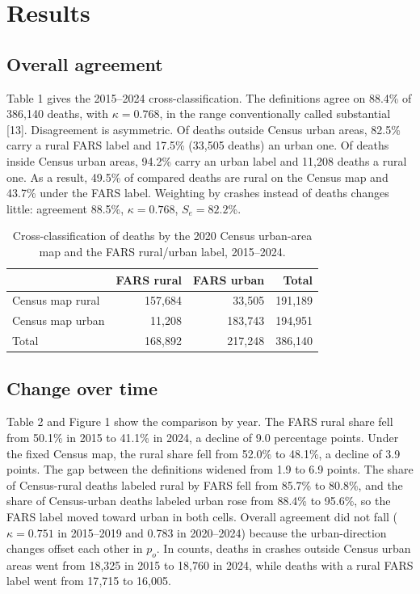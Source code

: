 \documentclass{article}
\begin{document}
\section{Results}

\subsection{Overall agreement}

Table 1 gives the 2015--2024 cross-classification. The definitions agree on 88.4\% of 386{,}140 deaths, with $\kappa = 0.768$, in the range conventionally called substantial [13]. Disagreement is asymmetric. Of deaths outside Census urban areas, 82.5\% carry a rural FARS label and 17.5\% (33{,}505 deaths) an urban one. Of deaths inside Census urban areas, 94.2\% carry an urban label and 11{,}208 deaths a rural one. As a result, 49.5\% of compared deaths are rural on the Census map and 43.7\% under the FARS label. Weighting by crashes instead of deaths changes little: agreement 88.5\%, $\kappa = 0.768$, $S_e = 82.2$\%.

\begin{table}[t]
\caption{Cross-classification of deaths by the 2020 Census urban-area map and the FARS rural/urban label, 2015--2024.}


\begin{tabular}{lrrr}
 & FARS rural & FARS urban & Total \\
\hline
Census map rural & 157{,}684 & 33{,}505 & 191{,}189 \\
Census map urban & 11{,}208 & 183{,}743 & 194{,}951 \\
Total & 168{,}892 & 217{,}248 & 386{,}140 \\
\end{tabular}

\end{table}

\subsection{Change over time}

Table 2 and Figure 1 show the comparison by year. The FARS rural share fell from 50.1\% in 2015 to 41.1\% in 2024, a decline of 9.0 percentage points. Under the fixed Census map, the rural share fell from 52.0\% to 48.1\%, a decline of 3.9 points. The gap between the definitions widened from 1.9 to 6.9 points. The share of Census-rural deaths labeled rural by FARS fell from 85.7\% to 80.8\%, and the share of Census-urban deaths labeled urban rose from 88.4\% to 95.6\%, so the FARS label moved toward urban in both cells. Overall agreement did not fall ($\kappa = 0.751$ in 2015--2019 and 0.783 in 2020--2024) because the urban-direction changes offset each other in $p_o$. In counts, deaths in crashes outside Census urban areas went from 18{,}325 in 2015 to 18{,}760 in 2024, while deaths with a rural FARS label went from 17{,}715 to 16{,}005.
\end{document}
